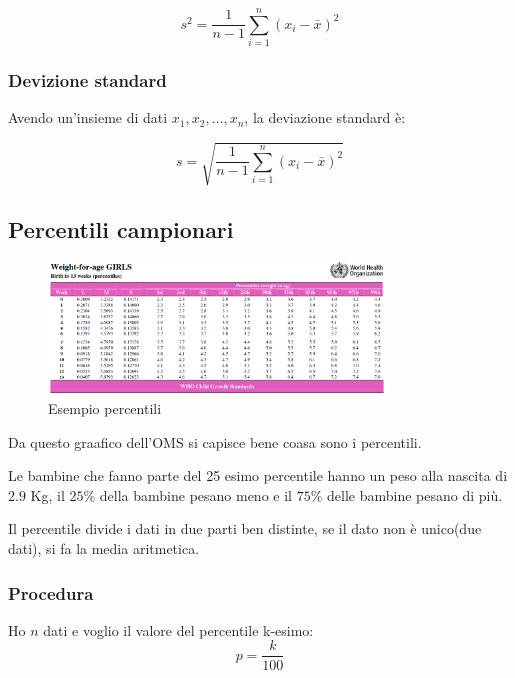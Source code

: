\begin{equation}
    s^2 = \displaystyle\frac{1}{n - 1} \displaystyle\sum_{i = 1}^{n} (x_i - \bar{x})^2
\end{equation}

\subsubsection{Devizione standard} 
Avendo un'insieme di dati $x_1, x_2, \dots, x_n$, la deviazione standard è:

\begin{equation}
    s = \sqrt{\displaystyle\frac{1}{n - 1} \displaystyle\sum_{i = 1}^{n} (x_i - \bar{x})^2}
\end{equation}


\subsection{Percentili campionari}

\begin{figure}[!ht]
    \begin{center}
        \includegraphics[width=0.8\textwidth]{./images/percentile_example.png}
    \end{center}
    \caption{Esempio percentili}
    \label{fig:esempio_percentili}
\end{figure}

Da questo graafico dell'OMS si capisce bene coasa sono i percentili. 

Le bambine che fanno parte del 25 esimo percentile hanno un peso alla nascita di $2.9$ Kg, 
il $25\%$ della bambine pesano meno e il $75\%$ delle bambine pesano di più. 

Il percentile divide i dati in due parti ben distinte, se il dato non è unico(due dati), si fa la media aritmetica. 

\subsubsection{Procedura}

Ho $n$ dati e voglio il valore del percentile k-esimo:
\begin{equation}
   p = \displaystyle\frac{k}{100} 
\end{equation}

